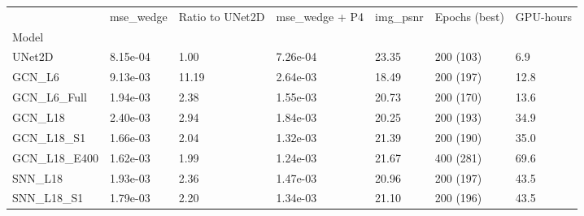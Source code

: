 \begin{tabular}{lllllll}
\toprule
 & mse\_wedge & Ratio to UNet2D & mse\_wedge + P4 & img\_psnr & Epochs (best) & GPU-hours \\
Model &  &  &  &  &  &  \\
\midrule
UNet2D & 8.15e-04 & 1.00 & 7.26e-04 & 23.35 & 200 (103) & 6.9 \\
GCN\_L6 & 9.13e-03 & 11.19 & 2.64e-03 & 18.49 & 200 (197) & 12.8 \\
GCN\_L6\_Full & 1.94e-03 & 2.38 & 1.55e-03 & 20.73 & 200 (170) & 13.6 \\
GCN\_L18 & 2.40e-03 & 2.94 & 1.84e-03 & 20.25 & 200 (193) & 34.9 \\
GCN\_L18\_S1 & 1.66e-03 & 2.04 & 1.32e-03 & 21.39 & 200 (190) & 35.0 \\
GCN\_L18\_E400 & 1.62e-03 & 1.99 & 1.24e-03 & 21.67 & 400 (281) & 69.6 \\
SNN\_L18 & 1.93e-03 & 2.36 & 1.47e-03 & 20.96 & 200 (197) & 43.5 \\
SNN\_L18\_S1 & 1.79e-03 & 2.20 & 1.34e-03 & 21.10 & 200 (196) & 43.5 \\
\bottomrule
\end{tabular}
